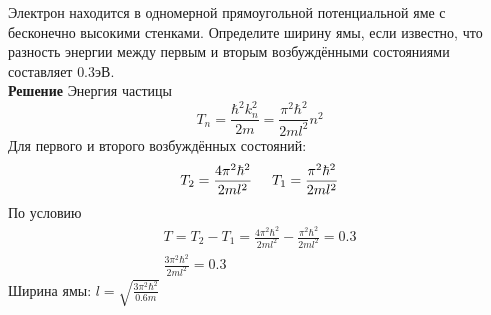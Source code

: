 \documentclass[__main__.tex]{subfiles}
\begin{document}
Электрон находится в одномерной прямоугольной потенциальной яме с бесконечно высокими стенками. Определите ширину ямы, если известно, что разность энергии между первым и вторым возбуждёнными состояниями составляет $0.3\text{эВ}$.\\ 

\textbf{Решение}
Энергия частицы
$$
T_n = \frac{\hbar^2k_n^2}{2m} = \frac{\mathcal{\pi}^2\hbar^2}{2ml^2}n^2
$$
Для первого и второго возбуждённых состояний:
$$
T_2 = \frac{4\mathcal{\pi}^2\hbar^2}{2ml^2} \hspace{0.5cm}
T_1 = \frac{\mathcal{\pi}^2\hbar^2}{2ml^2}
$$
По условию
\begin{gather*}
T = T_2 - T_1 = \frac{4\mathcal{\pi}^2\hbar^2}{2ml^2} - \frac{\mathcal{\pi}^2\hbar^2}{2ml^2} = 0.3\\ 
\frac{3\mathcal{\pi}^2\hbar^2}{2ml^2} = 0.3
\end{gather*}
Ширина ямы:
$l = \sqrt{\frac{3\mathcal{\pi}^2\hbar^2}{0.6m}}$
\end{document}
